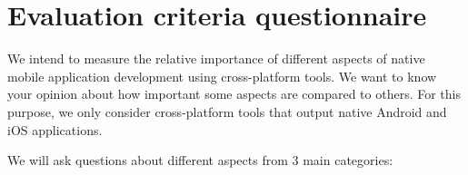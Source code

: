 \chapter{Evaluation criteria questionnaire}
\label{app:questionnaire}

\newcommand{\ahpscale}{%
    \begin{figure*}[h!]
        \centering
        \begin{pspicture}(8,1)
            \cnode*(0,1){4pt}{A}
            \cnode*(1,1){4pt}{B}
            \cnode*(2,1){4pt}{C}
            \cnode*(3,1){4pt}{D}
            \cnode*(4,1){4pt}{E}
            \cnode*(5,1){4pt}{F}
            \cnode*(6,1){4pt}{G}
            \cnode*(7,1){4pt}{H}
            \cnode*(8,1){4pt}{I}
            \ncline{A}{I}
            \rput(0,0){\rnode{AL}{\parbox{3cm}{\centering extremely less\\important than}}}
            \rput(4,0){\rnode{EL}{\parbox{3cm}{\centering equally\\important as}}}
            \rput(8,0){\rnode{IL}{\parbox{3cm}{\centering extremely more\\important than}}}
        \end{pspicture}
    \end{figure*}
}

We intend to measure the relative importance of different aspects of native mobile application development using cross-platform tools. We want to know your opinion about how important some aspects are compared to others. For this purpose, we only consider cross-platform tools that output native Android and iOS applications.

We will ask questions about different aspects from 3 main categories:

